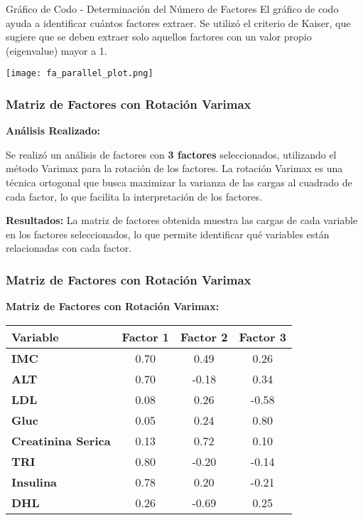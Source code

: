 \documentclass[
	11pt, %
]{beamer}
\begin{document}
\begin{frame}{Gráfico de Codo - Determinación del Número de Factores}
  El gráfico de codo ayuda a identificar cuántos factores extraer. Se utilizó el criterio de Kaiser, que sugiere que se deben extraer solo aquellos factores con un valor propio (eigenvalue) mayor a 1.
    
    
    \begin{center}
        \texttt{[image: fa\_parallel\_plot.png]} %
    \end{center}
\end{frame}



\begin{frame}
\frametitle{Matriz de Factores con Rotación Varimax}

\textbf{Análisis Realizado:}

Se realizó un análisis de factores con \textbf{3 factores} seleccionados, utilizando el método Varimax para la rotación de los factores. La rotación Varimax es una técnica ortogonal que busca maximizar la varianza de las cargas al cuadrado de cada factor, lo que facilita la interpretación de los factores.

\vspace{0.4cm}

\textbf{Resultados:} La matriz de factores obtenida muestra las cargas de cada variable en los factores seleccionados, lo que permite identificar qué variables están relacionadas con cada factor.

\end{frame}

\begin{frame}
\frametitle{Matriz de Factores con Rotación Varimax}

\textbf{Matriz de Factores con Rotación Varimax:}

\begin{table}[ht]
\centering
\begin{tabular}{|l|c|c|c|}
\hline
\textbf{Variable} & \textbf{Factor 1} & \textbf{Factor 2} & \textbf{Factor 3} \\
\hline
\textbf{IMC} & 0.70 & 0.49 & 0.26 \\
\hline
\textbf{ALT} & 0.70 & -0.18 & 0.34 \\
\hline
\textbf{LDL} & 0.08 & 0.26 & -0.58 \\
\hline
\textbf{Gluc} & 0.05 & 0.24 & 0.80 \\
\hline
\textbf{Creatinina Serica} & 0.13 & 0.72 & 0.10 \\
\hline
\textbf{TRI} & 0.80 & -0.20 & -0.14 \\
\hline
\textbf{Insulina} & 0.78 & 0.20 & -0.21 \\
\hline
\textbf{DHL} & 0.26 & -0.69 & 0.25 \\
\hline
\end{tabular}
\end{table}

\end{frame}
\end{document}

